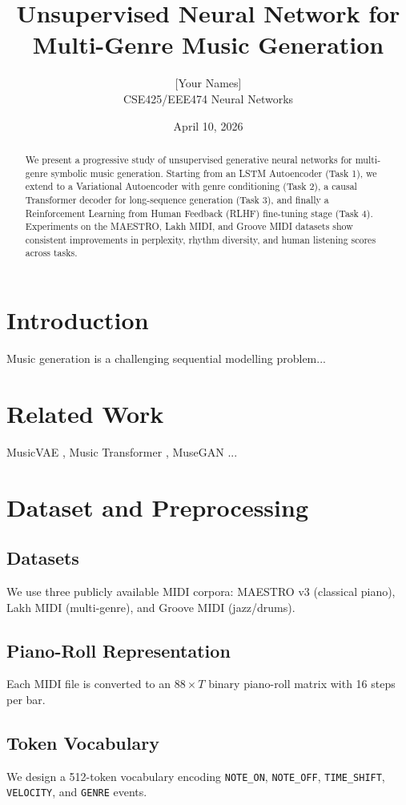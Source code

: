\documentclass{article}
\title{Unsupervised Neural Network for Multi-Genre Music Generation}
\author{[Your Names] \\ CSE425/EEE474 Neural Networks}
\date{April 10, 2026}
\begin{document}
\maketitle

\begin{abstract}
We present a progressive study of unsupervised generative neural networks for multi-genre symbolic music generation. Starting from an LSTM Autoencoder (Task 1), we extend to a Variational Autoencoder with genre conditioning (Task 2), a causal Transformer decoder for long-sequence generation (Task 3), and finally a Reinforcement Learning from Human Feedback (RLHF) fine-tuning stage (Task 4). Experiments on the MAESTRO, Lakh MIDI, and Groove MIDI datasets show consistent improvements in perplexity, rhythm diversity, and human listening scores across tasks.
\end{abstract}

\section{Introduction}
Music generation is a challenging sequential modelling problem...

\section{Related Work}
MusicVAE \cite{roberts2018hierarchical}, Music Transformer \cite{huang2018music}, MuseGAN \cite{dong2018musegan}...

\section{Dataset and Preprocessing}
\subsection{Datasets}
We use three publicly available MIDI corpora: MAESTRO v3 \cite{hawthorne2018enabling} (classical piano), Lakh MIDI \cite{raffel2016lakh} (multi-genre), and Groove MIDI \cite{gillick2019learning} (jazz/drums).

\subsection{Piano-Roll Representation}
Each MIDI file is converted to an $88 \times T$ binary piano-roll matrix with 16 steps per bar.

\subsection{Token Vocabulary}
We design a 512-token vocabulary encoding \texttt{NOTE\_ON}, \texttt{NOTE\_OFF}, \texttt{TIME\_SHIFT}, \texttt{VELOCITY}, and \texttt{GENRE} events.
\end{document}
